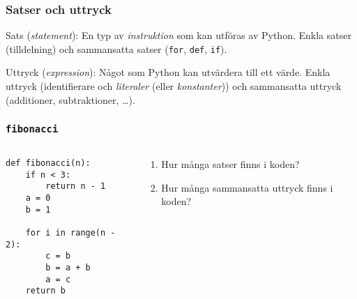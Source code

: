 \documentclass{beamer}
\begin{document}
  \begin{frame}
    \frametitle{Satser och uttryck}

    Sats (\textit{statement}): En typ av \emph{instruktion} som kan utföras av
    Python. Enkla satser (tilldelning) och sammansatta satser (\texttt{for},
    \texttt{def}, \texttt{if}).

    Uttryck (\textit{expression}): Något som Python kan utvärdera till ett
    värde. Enkla uttryck (identifierare och \textit{literaler} (eller
    \textit{konstanter})) och sammansatta uttryck (additioner, subtraktioner,
    \dots).

  \end{frame}

  \begin{frame}[fragile]
    \frametitle{\texttt{fibonacci}}

    \begin{columns}
      \begin{column}{0.48\textwidth}
        \begin{verbatim}
def fibonacci(n):
    if n < 3:
        return n - 1
    a = 0
    b = 1

    for i in range(n - 2):
        c = b
        b = a + b
        a = c
    return b
        \end{verbatim}
      \end{column}%
      \begin{column}{0.48\textwidth}
        \begin{enumerate}
          \item Hur många satser finns i koden?
          \item Hur många sammansatta uttryck finns i koden?
        \end{enumerate}
      \end{column}%
    \end{columns}
  \end{frame}
\end{document}
